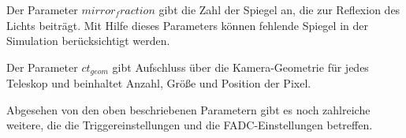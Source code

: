Der Parameter $mirror_fraction$ gibt die Zahl der Spiegel an, die zur Reflexion des Lichts beiträgt. 
Mit Hilfe dieses Parameters können fehlende Spiegel in der Simulation berücksichtigt werden.

Der Parameter $ct_{geom}$ gibt Aufschluss über die Kamera-Geometrie für jedes Teleskop und beinhaltet Anzahl, Größe und Position der Pixel.

Abgesehen von den oben beschriebenen Parametern gibt es noch zahlreiche weitere, die die Triggereinstellungen und die FADC-Einstellungen betreffen.


